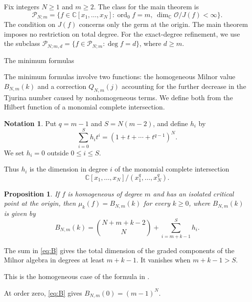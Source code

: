 \documentclass[12pt,reqno]{amsart}
\makeatletter
\renewcommand\subsection{\@startsection{subsection}{2}%
  \z@{.8\linespacing\@plus.3\linespacing}{.35\linespacing}%
  {\normalfont\bfseries}}
\newcommand{\C}{\mathbb C}
\newcommand{\ord}{\operatorname{ord}}
\newcommand{\Pclass}{\mathcal P_{N;m,d}}
\newcommand{\Pall}{\mathcal P_{N;m}}
\newcommand{\OO}{\mathcal O}
\newtheorem{proposition}[theorem]{Proposition}
\theoremstyle{definition}
\newtheorem{notation}[theorem]{Notation}
\makeatother
\begin{document}
 
Fix integers $N\geq1$ and $m\geq2$. The class for the
main theorem is
\begin{equation}\label{eq:unrestrictedclass}
 \Pall=
 \{f\in\C[x_1,\ldots,x_N]:
       \ord_0f=m,\ \dim_\C \OO/J(f)<\infty\}.
\end{equation}
 The condition on $J(f)$ concerns only the germ at the origin.
The main theorem imposes no restriction on total degree. For the
exact-degree refinement, we use the subclass
$\Pclass=\{f\in\Pall:\deg f=d\}$, where $d\geq m$.


\subsection{The minimum formulas}

The minimum formulas involve two functions: the homogeneous Milnor value
$B_{N,m}(k)$ and a correction $Q_{N,m}(j)$ accounting for the further
decrease in the Tjurina number caused by nonhomogeneous terms.
We define both from the Hilbert function of a monomial complete intersection.
 


\begin{notation}\label{not:parameters}
Put $q=m-1$ and $S=N(m-2)$, and define $h_i$ by
\begin{equation}\label{eq:parameters}
 \sum_{i=0}^{S}h_it^i=(1+t+\cdots+t^{q-1})^N.
\end{equation}
We set $h_i=0$ outside $0\leq i\leq S$.
\end{notation}
Thus $h_i$ is the dimension in degree $i$ of the monomial complete
intersection
\[
 \C[x_1,\ldots,x_N]/(x_1^q,\ldots,x_N^q).
\]
\begin{proposition}\label{prop:parameters}
If $f$ is homogeneous of degree $m$ and has an isolated critical
point at the origin, then $\mu_k(f)=B_{N,m}(k)$ for every $k\geq0$,
where $B_{N,m}(k)$ is given by
\begin{equation}\label{eq:B}
 B_{N,m}(k)=\binom{N+m+k-2}{N}
                    +\sum_{i=m+k-1}^{S}h_i.
\end{equation}
\end{proposition}


The sum in \eqref{eq:B} gives the total dimension of the graded
components of the Milnor algebra in degrees at least $m+k-1$.
It vanishes when $m+k-1>S$.

This is the homogeneous case of the formula in
\cite[Proposition~4.1]{LiuYauZhang2026}.


At order zero, \eqref{eq:B} gives $B_{N,m}(0)=(m-1)^N$.
\end{document}
